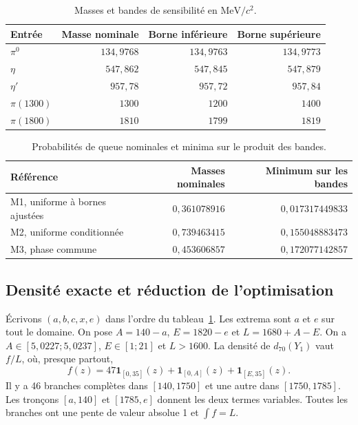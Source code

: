 \documentclass[11pt,a4paper]{article}
\newcommand{\ind}{\mathbf{1}}
\begin{document}
\begin{table}[htbp]
\centering
\caption{Masses et bandes de sensibilité en $\mathrm{MeV}/c^2$.}
\label{tab:data}
\begin{tabular}{lrrr}
\toprule
Entrée & Masse nominale & Borne inférieure & Borne supérieure\\
\midrule
$\pi^0$     & $134{,}9768$ & $134{,}9763$ & $134{,}9773$\\
$\eta$      & $547{,}862$  & $547{,}845$  & $547{,}879$\\
$\eta'$     & $957{,}78$   & $957{,}72$   & $957{,}84$\\
$\pi(1300)$ & $1300$       & $1200$       & $1400$\\
$\pi(1800)$ & $1810$       & $1799$       & $1819$\\
\bottomrule
\end{tabular}
\end{table}

\begin{table}[htbp]
\centering
\caption{Probabilités de queue nominales et minima sur le produit des bandes.}
\label{tab:results}
\begin{tabular}{lrr}
\toprule
Référence & Masses nominales & Minimum sur les bandes\\
\midrule
M1, uniforme à bornes ajustées & $0{,}361078916$ & $0{,}017317449833$\\
M2, uniforme conditionnée & $0{,}739463415$ & $0{,}155048883473$\\
M3, phase commune & $0{,}453606857$ & $0{,}172077142857$\\
\bottomrule
\end{tabular}
\end{table}

\subsection{Densité exacte et réduction de l'optimisation}

Écrivons $(a,b,c,x,e)$ dans l'ordre du tableau~\ref{tab:data}. Les extrema sont $a$ et $e$ sur tout le domaine. On pose $A=140-a$, $E=1820-e$ et $L=1680+A-E$. On a $A\in[5{,}0227;5{,}0237]$, $E\in[1;21]$ et $L>1600$. La densité de $d_{70}(Y_1)$ vaut $f/L$, où, presque partout,
\[
f(z)=47\ind_{[0,35]}(z)+\ind_{[0,A]}(z)+\ind_{[E,35]}(z).
\]
Il y a 46 branches complètes dans $[140,1750]$ et une autre dans $[1750,1785]$. Les tronçons $[a,140]$ et $[1785,e]$ donnent les deux termes variables. Toutes les branches ont une pente de valeur absolue 1 et $\int f=L$.
\end{document}
